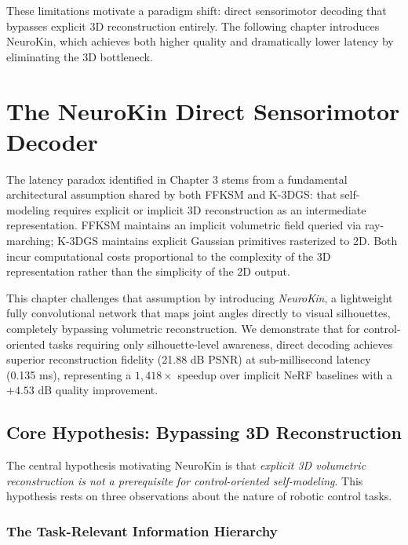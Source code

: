 ﻿\documentclass[12pt,a4paper,oneside]{report}
\begin{document}
These limitations motivate a paradigm shift: direct sensorimotor decoding that bypasses explicit 3D reconstruction entirely. The following chapter introduces NeuroKin, which achieves both higher quality and dramatically lower latency by eliminating the 3D bottleneck.









\chapter{The NeuroKin Direct Sensorimotor Decoder}

The latency paradox identified in Chapter 3 stems from a fundamental architectural assumption shared by both FFKSM and K-3DGS: that self-modeling requires explicit or implicit 3D reconstruction as an intermediate representation. FFKSM maintains an implicit volumetric field queried via ray-marching; K-3DGS maintains explicit Gaussian primitives rasterized to 2D. Both incur computational costs proportional to the complexity of the 3D representation rather than the simplicity of the 2D output.

This chapter challenges that assumption by introducing \textit{NeuroKin}, a lightweight fully convolutional network that maps joint angles directly to visual silhouettes, completely bypassing volumetric reconstruction. We demonstrate that for control-oriented tasks requiring only silhouette-level awareness, direct decoding achieves superior reconstruction fidelity (21.88 dB PSNR) at sub-millisecond latency (0.135 ms), representing a $1,418\times$ speedup over implicit NeRF baselines with a $+4.53$ dB quality improvement.

\section{Core Hypothesis: Bypassing 3D Reconstruction}

The central hypothesis motivating NeuroKin is that \textit{explicit 3D volumetric reconstruction is not a prerequisite for control-oriented self-modeling}. This hypothesis rests on three observations about the nature of robotic control tasks.

\subsection{The Task-Relevant Information Hierarchy}
\end{document}
